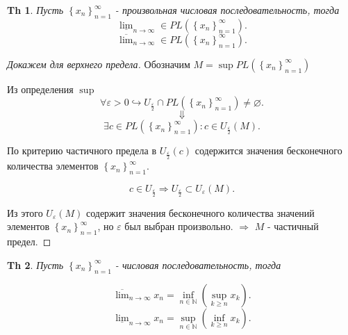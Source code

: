 \documentclass[a5paper, 10pt]{article}
\theoremstyle{plain}
\newtheorem{theorem}{Th}
\newcommand{\N}{\mathbb N}
\newcommand{\eps}{\varepsilon}
\newcommand{\hrarrow}{\hookrightarrow}
\newcommand{\Rarrow}{\Rightarrow}
\begin{document}
    \begin{theorem}
        Пусть $ \left\{x_n \right\}_{n = 1}^{\infty} $ - произвольная числовая последовательность, тогда
        \[
            \underline{\lim}_{n \to \infty} \in PL(\left\{x_n \right\}_{n = 1}^{\infty})
        .\] \[
            \overline{\lim}_{n \to \infty} \in PL(\left\{x_n \right\}_{n = 1}^{\infty})
        .\]
    \end{theorem}

    \begin{proof}[Докажем для верхнего предела]
        Обозначим $ M = \sup PL(\left\{x_n \right\}_{n = 1}^{\infty}) $

        Из определения $ \sup $
        \[
            \forall \eps > 0 \hrarrow U_{\frac{\eps}{2}} \cap PL(\left\{x_n \right\}_{n = 1}^{\infty}) \neq \varnothing
        .\] \[ \Downarrow \] \[
            \exists c \in PL(\left\{x_n \right\}_{n = 1}^{\infty}): c \in U_{\frac{\eps}{2}}(M)
        .\]

        По критерию частичного предела в $ U_{\frac{\eps}{2}}(c) $ содержится значения бесконечного количества элементов
        $ \left\{x_n \right\}_{n = 1}^{\infty} $.

        \[
            c \in U_{\frac{\eps}{2}} \Rarrow U_{\frac{\eps}{2}} \subset U_{\eps}(M)
        .\]

        Из этого $ U_{\eps}(M) $ содержит значения бесконечного количества значений элементов
        $ \left\{x_n \right\}_{n = 1}^{\infty} $, но $ \eps $ был выбран произвольно. $ \Rarrow $
        $ M $ - частичный предел.
    \end{proof}

    \begin{theorem}
        Пусть $ \left\{x_n \right\}_{n = 1}^{\infty} $ - числовая последовательность, тогда

        \[
            \overline{\lim}_{n \to \infty} x_n = \inf_{n \in \N}\left(\sup_{k \geq n} x_k\right)
        .\] \[
            \underline{\lim}_{n \to \infty} x_n = \sup_{n \in \N}\left(\inf_{k \geq n} x_k\right)
        .\]
    \end{theorem}
\end{document}
